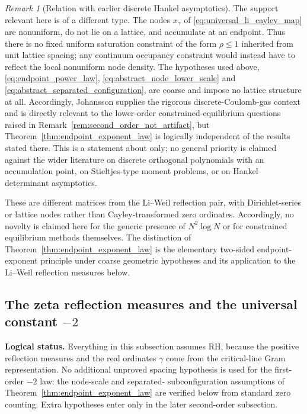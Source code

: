 \documentclass[preprint,12pt]{elsarticle}
\numberwithin{equation}{section}
\theoremstyle{plain}
\theoremstyle{definition}
\theoremstyle{remark}
\newtheorem{remark}[theorem]{Remark}
\newcommand{\RH}{\mathrm{RH}}
\begin{document}
\begin{remark}[Relation with earlier discrete Hankel asymptotics]
The support relevant here is of a different type.  The nodes $x_\gamma$ of \eqref{eq:universal_li_cayley_map} are nonuniform, do not lie on a lattice, and accumulate at an endpoint.  Thus there is no fixed uniform saturation constraint of the form $\rho\le1$ inherited from unit lattice spacing; any continuum occupancy constraint would instead have to reflect the local nonuniform node density.  The hypotheses used above, \eqref{eq:endpoint_power_law}, \eqref{eq:abstract_node_lower_scale} and \eqref{eq:abstract_separated_configuration}, are coarse and impose no lattice structure at all.  Accordingly, Johansson supplies the rigorous discrete-Coulomb-gas context and is directly relevant to the lower-order constrained-equilibrium questions raised in Remark~\ref{rem:second_order_not_artifact}, but Theorem~\ref{thm:endpoint_exponent_law} is logically independent of the results stated there.  This is a statement about \cite{Johansson2001} only; no general priority is claimed against the wider literature on discrete orthogonal polynomials with an accumulation point, on Stieltjes-type moment problems, or on Hankel determinant asymptotics.

These are different matrices from the Li--Weil reflection pair, with Dirichlet-series or lattice nodes rather than Cayley-transformed zero ordinates. Accordingly, no novelty is claimed here for the generic presence of $N^2\log N$ or for constrained equilibrium methods themselves. The distinction of Theorem~\ref{thm:endpoint_exponent_law} is the elementary two-sided endpoint-exponent principle under coarse geometric hypotheses and its application to the Li--Weil reflection measures below.
\end{remark}

\subsection{\texorpdfstring{The zeta reflection measures and the universal constant $-2$}{The zeta reflection measures and the universal constant -2}}

\noindent\textbf{Logical status.}\quad
Everything in this subsection assumes \(\RH\), because the positive reflection measures and the
real ordinates \(\gamma\) come from the critical-line Gram representation.  No additional
unproved spacing hypothesis is used for the first-order \(-2\) law: the node-scale and separated-
subconfiguration assumptions of Theorem~\ref{thm:endpoint_exponent_law} are verified below from
standard zero counting.  Extra hypotheses enter only in the later second-order subsection.
\end{document}
